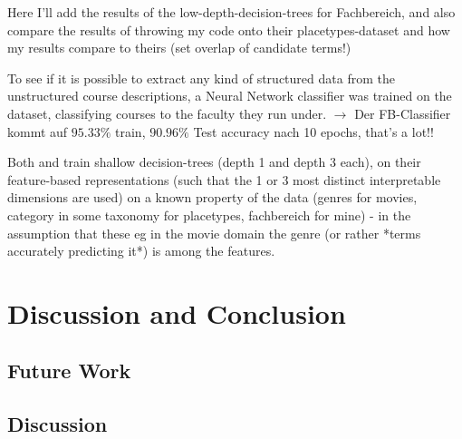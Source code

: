 \documentclass[11pt,
  paper=a4, 
  twoside,  %
  hidelinks,
  bibliography=totocnumbered,
	captions=tableheading,
	BCOR=10mm
]{scrreprt}
\theoremstyle{definition}
\begin{document}

Here I'll add the results of the low-depth-decision-trees for Fachbereich, and also compare the results of throwing my code onto their placetypes-dataset and how my results compare to theirs 
(set overlap of candidate terms!)

To see if it is possible to extract any kind of structured data from the unstructured course descriptions, a Neural Network classifier was trained on the dataset, classifying courses to the faculty they run under. 
$\rightarrow$ Der FB-Classifier kommt auf $95.33\%$ train, $90.96\%$ Test accuracy nach 10 epochs, that's a lot!!


Both \cite{Ager2018} and \cite{Alshaikh2020} train shallow decision-trees (depth 1 and depth 3 each), on their feature-based representations (such that the 1 or 3 most distinct interpretable dimensions are used) on a known property of the data (genres for movies, category in some taxonomy for placetypes, fachbereich for mine) - in the assumption that these eg in the movie domain the genre (or rather *terms accurately predicting it*) is among the features.



\chapter{Discussion and Conclusion}

\section{Future Work}




\section{Discussion}
\end{document}
